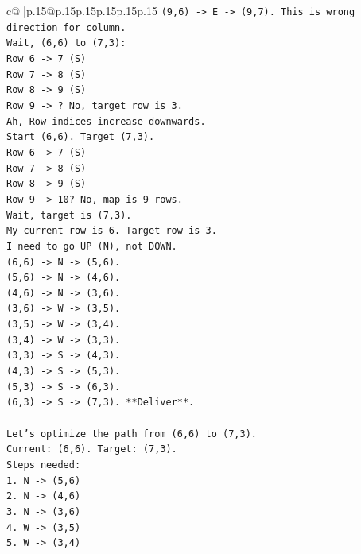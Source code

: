 \documentclass{article}
\begin{document}
{\begin{supertabular}{c@{$\;$}|p{.15\linewidth}@{}p{.15\linewidth}p{.15\linewidth}p{.15\linewidth}p{.15\linewidth}p{.15\linewidth}}
{{{\texttt{(9,6) {-}> E {-}> (9,7). This is wrong direction for column.} \\
\texttt{Wait, (6,6) to (7,3):} \\
\texttt{Row 6 {-}> 7 (S)} \\
\texttt{Row 7 {-}> 8 (S)} \\
\texttt{Row 8 {-}> 9 (S)} \\
\texttt{Row 9 {-}> ? No, target row is 3.} \\
\texttt{Ah, Row indices increase downwards.} \\
\texttt{Start (6,6). Target (7,3).} \\
\texttt{Row 6 {-}> 7 (S)} \\
\texttt{Row 7 {-}> 8 (S)} \\
\texttt{Row 8 {-}> 9 (S)} \\
\texttt{Row 9 {-}> 10? No, map is 9 rows.} \\
\texttt{Wait, target is (7,3).} \\
\texttt{My current row is 6. Target row is 3.} \\
\texttt{I need to go UP (N), not DOWN.} \\
\texttt{(6,6) {-}> N {-}> (5,6).} \\
\texttt{(5,6) {-}> N {-}> (4,6).} \\
\texttt{(4,6) {-}> N {-}> (3,6).} \\
\texttt{(3,6) {-}> W {-}> (3,5).} \\
\texttt{(3,5) {-}> W {-}> (3,4).} \\
\texttt{(3,4) {-}> W {-}> (3,3).} \\
\texttt{(3,3) {-}> S {-}> (4,3).} \\
\texttt{(4,3) {-}> S {-}> (5,3).} \\
\texttt{(5,3) {-}> S {-}> (6,3).} \\
\texttt{(6,3) {-}> S {-}> (7,3). **Deliver**.} \\
\\ 
\texttt{Let's optimize the path from (6,6) to (7,3).} \\
\texttt{Current: (6,6). Target: (7,3).} \\
\texttt{Steps needed:} \\
\texttt{1. N {-}> (5,6)} \\
\texttt{2. N {-}> (4,6)} \\
\texttt{3. N {-}> (3,6)} \\
\texttt{4. W {-}> (3,5)} \\
\texttt{5. W {-}> (3,4)} \\
}}}
\end{supertabular}}
\end{document}
